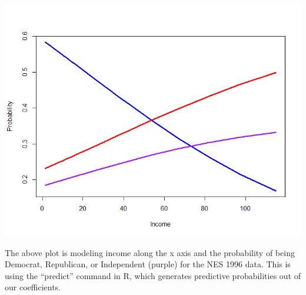 \documentclass[12pt]{article}\usepackage[]{graphicx}\usepackage[]{color}
\begin{document}
\begin{flushleft}
\begin{center}
\includegraphics[scale=.7]{IncPlot}
\end{center}

The above plot is modeling income along the x axis and the probability of being Democrat, Republican, or Independent (purple) for the NES 1996 data. This is using the ``predict'' command in R, which generates predictive probabilities out of our coefficients.


\end{flushleft}
\end{document}
